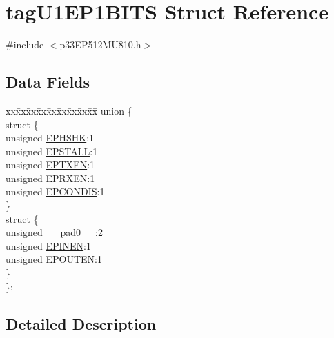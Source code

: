 \hypertarget{structtag_u1_e_p1_b_i_t_s}{}\section{tag\+U1\+E\+P1\+B\+I\+TS Struct Reference}
\label{structtag_u1_e_p1_b_i_t_s}


{\ttfamily \#include $<$p33\+E\+P512\+M\+U810.\+h$>$}

\subsection*{Data Fields}
\begin{DoxyCompactItemize}
\item 
\begin{tabbing}
xx\=xx\=xx\=xx\=xx\=xx\=xx\=xx\=xx\=\kill
union \{\\
\>struct \{\\
\>\>unsigned \hyperlink{structtag_u1_e_p1_b_i_t_s_a0d06430217cb4b189fbe9d0c4b460482}{EPHSHK}:1\\
\>\>unsigned \hyperlink{structtag_u1_e_p1_b_i_t_s_a47042104f04ebe06a23f9789bd400d7e}{EPSTALL}:1\\
\>\>unsigned \hyperlink{structtag_u1_e_p1_b_i_t_s_aa2d88c1be513e759c136823c86a355b4}{EPTXEN}:1\\
\>\>unsigned \hyperlink{structtag_u1_e_p1_b_i_t_s_a8a388d32ceffb87230e660b6793f2857}{EPRXEN}:1\\
\>\>unsigned \hyperlink{structtag_u1_e_p1_b_i_t_s_a1bd26df05d2b5a11b20ee548fce90c3e}{EPCONDIS}:1\\
\>\} \\
\>struct \{\\
\>\>unsigned \hyperlink{structtag_u1_e_p1_b_i_t_s_adf71f3d8410c1f1dbbc96680a92c49af}{\_\_pad0\_\_}:2\\
\>\>unsigned \hyperlink{structtag_u1_e_p1_b_i_t_s_a8b6d98cdf233ac90ff19d16d9a89215e}{EPINEN}:1\\
\>\>unsigned \hyperlink{structtag_u1_e_p1_b_i_t_s_adf87e8acfbb27a5626e21b3e3bd106fd}{EPOUTEN}:1\\
\>\} \\
\}; \\

\end{tabbing}\end{DoxyCompactItemize}


\subsection{Detailed Description}


